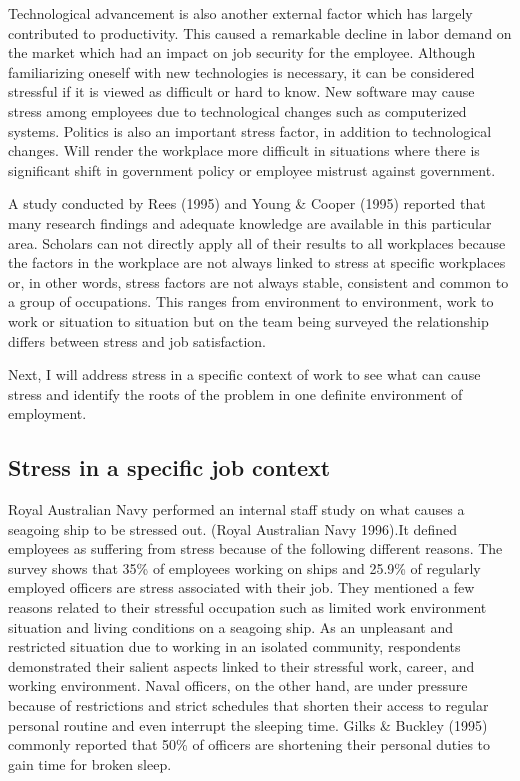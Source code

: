 Technological advancement is also another external factor which has largely contributed to productivity. This caused a remarkable decline in labor demand on the market which had an impact on job security for the employee. Although familiarizing oneself with new technologies is necessary, it can be considered stressful if it is viewed as difficult or hard to know. New software may cause stress among employees due to technological changes such as computerized systems. Politics is also an important stress factor, in addition to technological changes. Will render the workplace more difficult in situations where there is significant shift in government policy or employee mistrust against government.  \citep[p.309-320]{Bloisi2007ManagementBehaviour}

A study conducted by Rees (1995) and Young \& Cooper (1995) reported that many research findings and adequate knowledge are available in this particular area. Scholars can not directly apply all of their results to all workplaces because the factors in the workplace are not always linked to stress at specific workplaces or, in other words, stress factors are not always stable, consistent and common to a group of occupations. This ranges from environment to environment, work to work or situation to situation but on the team being surveyed the relationship differs between stress and job satisfaction.  \citep[p.  8]{Fairbrother2003WorkplaceSatisfaction}  

Next, I will address stress in a specific context of work to see what can cause stress and identify the roots of the problem in one definite environment of employment.
\subsection{Stress in a specific job context}
Royal Australian Navy performed an internal staff study on what causes a seagoing ship to be stressed out. (Royal Australian Navy 1996).It defined employees as suffering from stress because of the following different reasons. The survey shows that 35\% of employees working on ships and 25.9\% of regularly employed officers are stress associated with their job. They mentioned a few reasons related to their stressful occupation such as limited work environment situation and living conditions on a seagoing ship. As an unpleasant and restricted situation due to working in an isolated community, respondents demonstrated their salient aspects linked to their stressful work, career, and working environment.  Naval officers, on the other hand, are under pressure because of restrictions and strict schedules that shorten their access to regular personal routine and even interrupt the sleeping time.  Gilks \& Buckley (1995) commonly reported that 50\% of officers are shortening their personal duties to gain time for broken sleep.

